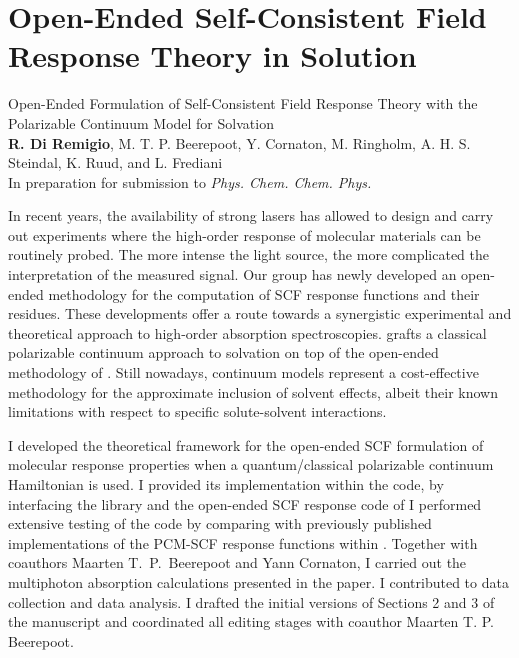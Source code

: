 \section{Open-Ended Self-Consistent Field Response Theory in
Solution}\label{sec:pcmopenrsp}

\begin{tcolorbox}
  {\small
  \textsf{Open-Ended Formulation of Self-Consistent Field Response Theory with
  the Polarizable Continuum Model for Solvation
  }
  \\
  \textbf{R. Di Remigio}, M. T. P. Beerepoot, Y. Cornaton, M. Ringholm,
  A. H. S. Steindal, K. Ruud, and L. Frediani
  \\
  In preparation for submission to \textit{Phys. Chem. Chem. Phys.}
  }
\end{tcolorbox}

In recent years, the availability of strong lasers has allowed to
design and carry out experiments where the high-order response of
molecular materials can be routinely probed.
The more intense the light source, the more complicated the interpretation of
the measured signal.
Our group has newly developed an open-ended methodology for the computation of
\acrshort{SCF} response functions\autocite{Thorvaldsen2008-sg, Ringholm2014-gx} and
their residues.\autocite{Friese2015-kb}
These developments offer a route towards a synergistic experimental and
theoretical approach to high-order absorption spectroscopies.
 grafts a classical polarizable continuum approach to solvation on top
of the open-ended methodology of \citeauthor{Thorvaldsen2008-sg}.
Still nowadays, continuum models represent a cost-effective methodology for the
approximate inclusion of solvent effects, albeit their known limitations with respect
to specific solute-solvent interactions.

I developed the theoretical framework for the open-ended \acrshort{SCF} formulation
of molecular response properties when a quantum/classical polarizable continuum
Hamiltonian is used.\autocite{Thorvaldsen2008-sg, Lipparini2010-be}
I provided its implementation within the \DALTON code, by interfacing the
\pcmsolver library and the open-ended \acrshort{SCF} response code of
\citeauthor{Ringholm2014-gx}\autocite{Ringholm2014-gx, Friese2015-kb}
I performed extensive testing of the code by comparing with previously
published implementations of the \acrshort{PCM}-\acrshort{SCF} response functions within
\DALTON.\autocite{Cammi2003-qy, Frediani2005-nc, Ferrighi2010-pm}
Together with coauthors Maarten T.~P.~Beerepoot and Yann Cornaton, I carried out
the multiphoton absorption calculations presented in the paper. I contributed
to data collection and data analysis.
I drafted the initial versions of Sections 2 and 3 of the manuscript and coordinated all
editing stages with coauthor Maarten T. P. Beerepoot.
